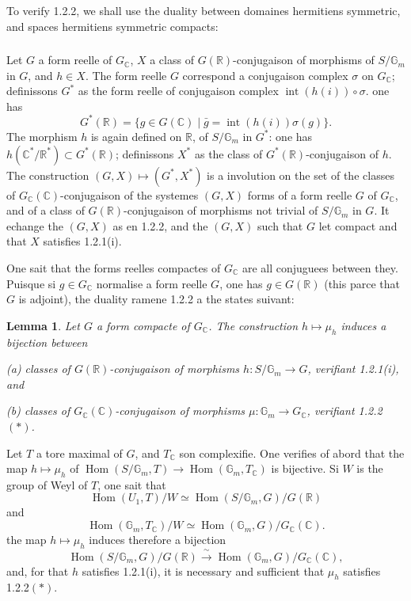 \documentclass[12pt,a4paper]{article}
\theoremstyle{plain}
\newtheorem{lemma}[theorem]{Lemma}
\theoremstyle{definition}
\theoremstyle{remark}
\DeclareMathOperator{\Hom}{Hom}
\DeclareMathOperator{\Int}{int}
\newcommand{\RR}{\mathbb{R}}
\newcommand{\CC}{\mathbb{C}}
\newcommand{\Gm}{\mathbb{G}}
\begin{document}
To verify 1.2.2, we shall use the duality between domaines hermitiens symmetric, and spaces hermitiens symmetric compacts:

\subsubsection{}

Let $G$ a form reelle of $G_{\CC}$, $X$ a class of $G(\RR)$-conjugaison of morphisms of $S/\Gm_m$ in $G$, and $h \in X$. The form reelle $G$ correspond a conjugaison complex $\sigma$ on $G_{\CC}$; definissons $G^*$ as the form reelle of conjugaison complex $\Int(h(i))\circ\sigma$. one has
\[
G^*(\RR) = \{g \in G(\CC) \mid \bar{g} = \Int(h(i))\sigma(g)\}.
\]
The morphism $h$ is again defined on $\RR$, of $S/\Gm_m$ in $G^*$: one has $h(\CC^*/\RR^*) \subset G^*(\RR)$; definissons $X^*$ as the class of $G^*(\RR)$-conjugaison of $h$. The construction $(G,X) \mapsto (G^*,X^*)$ is a involution on the set of the classes of $G_{\CC}(\CC)$-conjugaison of the systemes $(G,X)$ forms of a form reelle $G$ of $G_{\CC}$, and of a class of $G(\RR)$-conjugaison of morphisms not trivial of $S/\Gm_m$ in $G$. It echange the $(G,X)$ as en 1.2.2, and the $(G,X)$ such that $G$ let compact and that $X$ satisfies 1.2.1(i).

One sait that the forms reelles compactes of $G_{\CC}$ are all conjuguees between they. Puisque si $g \in G_{\CC}$ normalise a form reelle $G$, one has $g \in G(\RR)$ (this parce that $G$ is adjoint), the duality ramene 1.2.2 a the states suivant:

\begin{lemma}
Let $G$ a form compacte of $G_{\CC}$. The construction $h \mapsto \mu_h$ induces a bijection between

\textup{(a)} classes of $G(\RR)$-conjugaison of morphisms $h:S/\Gm_m \to G$, verifiant 1.2.1(i), and

\textup{(b)} classes of $G_{\CC}(\CC)$-conjugaison of morphisms $\mu:\Gm_m \to G_{\CC}$, verifiant 1.2.2$(*)$.
\end{lemma}

Let $T$ a tore maximal of $G$, and $T_{\CC}$ son complexifie. One verifies of abord that the map $h \mapsto \mu_h$ of $\Hom(S/\Gm_m,T) \to \Hom(\Gm_m,T_{\CC})$ is bijective. Si $W$ is the group of Weyl of $T$, one sait that
\[
\Hom(U_1,T)/W \simeq \Hom(S/\Gm_m,G)/G(\RR)
\]
and
\[
\Hom(\Gm_m,T_{\CC})/W \simeq \Hom(\Gm_m,G)/G_{\CC}(\CC).
\]
the map $h \mapsto \mu_h$ induces therefore a bijection
\[
\Hom(S/\Gm_m,G)/G(\RR) \xrightarrow{\;\sim\;} \Hom(\Gm_m,G)/G_{\CC}(\CC),
\]
and, for that $h$ satisfies 1.2.1(i), it is necessary and sufficient that $\mu_h$ satisfies 1.2.2$(*)$.
\end{document}
